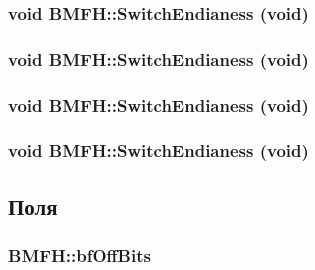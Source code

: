 \hypertarget{class_b_m_f_h_749e4bb6cfa10ed9fa77c3578c471110}{
\subsubsection[{SwitchEndianess}]{\setlength{\rightskip}{0pt plus 5cm}void BMFH::SwitchEndianess (void)}}
\label{class_b_m_f_h_749e4bb6cfa10ed9fa77c3578c471110}


\hypertarget{class_b_m_f_h_749e4bb6cfa10ed9fa77c3578c471110}{
\subsubsection[{SwitchEndianess}]{\setlength{\rightskip}{0pt plus 5cm}void BMFH::SwitchEndianess (void)}}
\label{class_b_m_f_h_749e4bb6cfa10ed9fa77c3578c471110}


\hypertarget{class_b_m_f_h_749e4bb6cfa10ed9fa77c3578c471110}{
\subsubsection[{SwitchEndianess}]{\setlength{\rightskip}{0pt plus 5cm}void BMFH::SwitchEndianess (void)}}
\label{class_b_m_f_h_749e4bb6cfa10ed9fa77c3578c471110}


\hypertarget{class_b_m_f_h_749e4bb6cfa10ed9fa77c3578c471110}{
\subsubsection[{SwitchEndianess}]{\setlength{\rightskip}{0pt plus 5cm}void BMFH::SwitchEndianess (void)}}
\label{class_b_m_f_h_749e4bb6cfa10ed9fa77c3578c471110}




\subsection{Поля}
\hypertarget{class_b_m_f_h_3ede15c91c9ce0a65c68fe2be591448a}{
\subsubsection[{bfOffBits}]{ {\bf BMFH::bfOffBits}}}
\label{class_b_m_f_h_3ede15c91c9ce0a65c68fe2be591448a}


